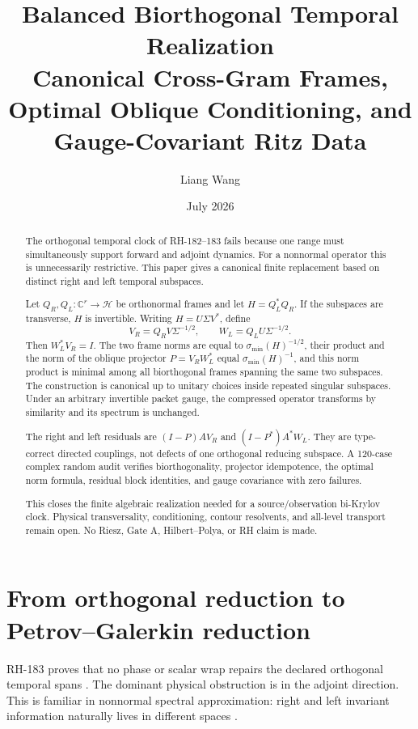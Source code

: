 \documentclass[12pt]{article}
\title{Balanced Biorthogonal Temporal Realization\\
\large Canonical Cross-Gram Frames, Optimal Oblique Conditioning, and Gauge-Covariant Ritz Data}
\author{Liang Wang}
\date{July 2026}
\theoremstyle{remark}
\newcommand{\cH}{\mathcal H}
\begin{document}
\maketitle

\begin{abstract}
The orthogonal temporal clock of RH-182--183 fails because one range must
simultaneously support forward and adjoint dynamics.  For a nonnormal
operator this is unnecessarily restrictive.  This paper gives a canonical
finite replacement based on distinct right and left temporal subspaces.

Let $Q_R,Q_L:\mathbb C^r\to\cH$ be orthonormal frames and let
$H=Q_L^*Q_R$.  If the subspaces are transverse, $H$ is invertible.  Writing
$H=U\Sigma V^*$, define
\[
 V_R=Q_RV\Sigma^{-1/2},
 \qquad
 W_L=Q_LU\Sigma^{-1/2}.
\]
Then $W_L^*V_R=I$.  The two frame norms are equal to
$\sigma_{\min}(H)^{-1/2}$, their product and the norm of the oblique
projector $P=V_RW_L^*$ equal $\sigma_{\min}(H)^{-1}$, and this norm product
is minimal among all biorthogonal frames spanning the same two subspaces.
The construction is canonical up to unitary choices inside repeated
singular subspaces.  Under an arbitrary invertible packet gauge, the
compressed operator transforms by similarity and its spectrum is unchanged.

The right and left residuals are
$(I-P)AV_R$ and $(I-P^*)A^*W_L$.  They are type-correct directed couplings,
not defects of one orthogonal reducing subspace.  A 120-case complex random
audit verifies biorthogonality, projector idempotence, the optimal norm
formula, residual block identities, and gauge covariance with zero failures.

This closes the finite algebraic realization needed for a source/observation
bi-Krylov clock.  Physical transversality, conditioning, contour resolvents,
and all-level transport remain open.  No Riesz, Gate A, Hilbert--Polya, or RH
claim is made.
\end{abstract}

\section{From orthogonal reduction to Petrov--Galerkin reduction}

RH-183 proves that no phase or scalar wrap repairs the declared orthogonal
temporal spans \citep{WangRH183}.  The dominant physical obstruction is in
the adjoint direction.  This is familiar in nonnormal spectral approximation:
right and left invariant information naturally lives in different spaces
\citep{StewartSun1990,Kato1995}.
\end{document}
